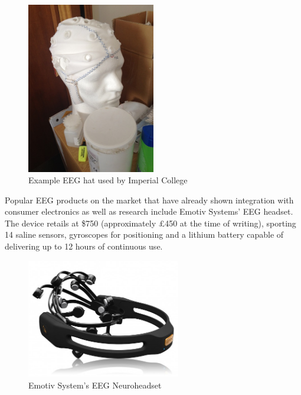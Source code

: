 \documentclass[]{article}
\begin{document}
\begin{figure}[H]
	\begin{center}
		\includegraphics[width = 0.5\textwidth]{eeghat}
	\end{center}
	\caption{Example \ac{EEG} hat used by Imperial College}
	\label{fig:eeghat}
\end{figure}

Popular \ac{EEG} products on the market that have already shown integration with consumer electronics as well as research include Emotiv Systems' \ac{EEG} headset. The device retails at \$750 (approximately £450 at the time of writing), sporting 14 saline sensors, gyroscopes for positioning and a lithium battery capable of delivering up to 12 hours of continuous use.

\begin{figure}[htb]
	\begin{center}
		\includegraphics[width = 0.6\textwidth]{emotive}
	\end{center}
	\caption{Emotiv System's \ac{EEG} Neuroheadset}
	\label{fig:emotive}
\end{figure}
\end{document}
